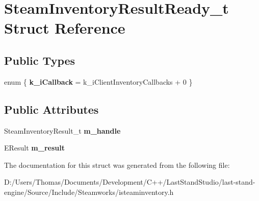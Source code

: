 \hypertarget{structSteamInventoryResultReady__t}{}\section{Steam\+Inventory\+Result\+Ready\+\_\+t Struct Reference}
\label{structSteamInventoryResultReady__t}
\subsection*{Public Types}
\begin{DoxyCompactItemize}
\item 
\hypertarget{structSteamInventoryResultReady__t_a631ecc6fd0ae64e49f087dbd496cd0ad}{}enum \{ {\bfseries k\+\_\+i\+Callback} = k\+\_\+i\+Client\+Inventory\+Callbacks + 0
 \}\label{structSteamInventoryResultReady__t_a631ecc6fd0ae64e49f087dbd496cd0ad}

\end{DoxyCompactItemize}
\subsection*{Public Attributes}
\begin{DoxyCompactItemize}
\item 
\hypertarget{structSteamInventoryResultReady__t_a658ee00d502cdcd5ff4560bddb1e47dd}{}Steam\+Inventory\+Result\+\_\+t {\bfseries m\+\_\+handle}\label{structSteamInventoryResultReady__t_a658ee00d502cdcd5ff4560bddb1e47dd}

\item 
\hypertarget{structSteamInventoryResultReady__t_af75c8e78d3755be36cccdc79ad9afa57}{}E\+Result {\bfseries m\+\_\+result}\label{structSteamInventoryResultReady__t_af75c8e78d3755be36cccdc79ad9afa57}

\end{DoxyCompactItemize}


The documentation for this struct was generated from the following file\+:\begin{DoxyCompactItemize}
\item 
D\+:/\+Users/\+Thomas/\+Documents/\+Development/\+C++/\+Last\+Stand\+Studio/last-\/stand-\/engine/\+Source/\+Include/\+Steamworks/isteaminventory.\+h\end{DoxyCompactItemize}
